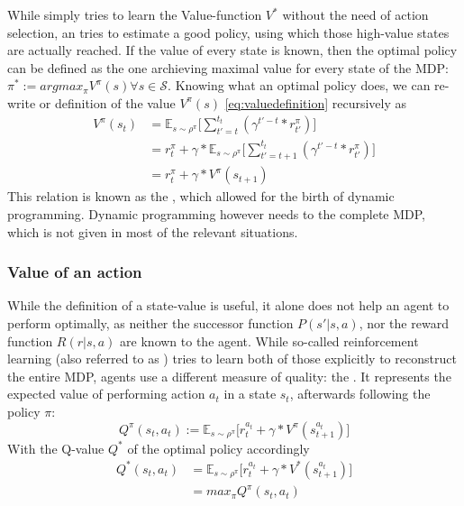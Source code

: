 While  simply tries to learn the Value-function $V^*$ without the need of action selection, an  tries to estimate a good policy, using which those high-value states are actually reached. If the value of every state is known, then the optimal policy can be defined as the one archieving maximal value for every state of the MDP: \mbox{$\pi^* := argmax_\pi V^\pi(s) \forall s \in \mathcal{S}$}. Knowing what an optimal policy does, we can re-write or definition of the value $V^\pi(s)$ \ref{eq:valuedefinition} recursively as
\begin{align}
	V^\pi(s_t) &= \mathds{E}_{s\sim\rho^\pi} \Big[ \sum_{t'=t}^{t_t} ( \gamma^{t'-t} * r^\pi_{t'} ) \Big] \nonumber \\
	&= r_t^\pi + \gamma * \mathds{E}_{s\sim\rho^\pi} \Big[ \sum_{t'=t+1}^{t_t} ( \gamma^{t'-t} * r^\pi_{t'} ) \Big] \nonumber \\
	&= r_t^\pi + \gamma * V^\pi(s_{t+1}) \label{statebellman}
\end{align}
This relation is known as the , which allowed for the birth of dynamic programming. Dynamic programming however needs to the complete MDP, which is not given in most of the relevant situations.

\subsubsection{Value of an action}
While the definition of a state-value is useful, it alone does not help an agent to perform optimally, as neither the successor function $P(s'|s,a)$, nor the reward function $R(r|s,a)$ are known to the agent. While so-called  reinforcement learning (also referred to as ) tries to learn both of those explicitly to reconstruct the entire MDP,  agents use a different measure of quality: the . It represents the expected value of performing action $a_t$ in a state $s_t$, afterwards following the policy $\pi$:
\begin{equation} \label{eq:1.2}
	Q^\pi(s_t,a_t) :=  \mathds{E}_{s\sim\rho^\pi} \big[ r_t^{a_t} + \gamma * V^\pi(s_{t+1}^{a_t}) \big]
\end{equation}
With the Q-value $Q^*$ of the optimal policy accordingly 
\begin{align*}
	Q^*(s_t,a_t) &=  \mathds{E}_{s\sim\rho^\pi} \big[ r_t^{a_t} + \gamma * V^*(s_{t+1}^{a_t}) \big] \\
	&= max_\pi Q^\pi(s_t,a_t)
\end{align*}

